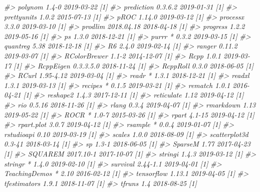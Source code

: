 \documentclass[]{krantz}
\makeatletter
\newenvironment{Shaded}{\begin{snugshade}}{\end{snugshade}}
\newcommand{\CommentTok}[1]{\textcolor[rgb]{0.37,0.37,0.37}{\textit{#1}}}
\newenvironment{kframe}{%
\medskip{}
\setlength{\fboxsep}{.8em}
 \def\at@end@of@kframe{}%
 \ifinner\ifhmode%
  \def\at@end@of@kframe{\end{minipage}}%
  \begin{minipage}{\columnwidth}%
 \fi\fi%
 \def\FrameCommand##1{\hskip\@totalleftmargin \hskip-\fboxsep
 \colorbox{shadecolor}{##1}\hskip-\fboxsep
     \hskip-\linewidth \hskip-\@totalleftmargin \hskip\columnwidth}%
 \MakeFramed {\advance\hsize-\width
   \@totalleftmargin\z@ \linewidth\hsize
   \@setminipage}}%
 {\par\unskip\endMakeFramed%
 \at@end@of@kframe}
\renewenvironment{Shaded}{\begin{kframe}}{\end{kframe}}
\makeatother
\begin{document}
\begin{Shaded}
\begin{Highlighting}[]
\CommentTok{#>    polynom         1.4-0      2019-03-22 [1]}
\CommentTok{#>    prediction      0.3.6.2    2019-01-31 [1]}
\CommentTok{#>    prettyunits     1.0.2      2015-07-13 [1]}
\CommentTok{#>    pROC            1.14.0     2019-03-12 [1]}
\CommentTok{#>    processx        3.3.0      2019-03-10 [1]}
\CommentTok{#>    prodlim         2018.04.18 2018-04-18 [1]}
\CommentTok{#>    progress        1.2.2      2019-05-16 [1]}
\CommentTok{#>    ps              1.3.0      2018-12-21 [1]}
\CommentTok{#>    purrr         * 0.3.2      2019-03-15 [1]}
\CommentTok{#>    quantreg        5.38       2018-12-18 [1]}
\CommentTok{#>    R6              2.4.0      2019-02-14 [1]}
\CommentTok{#>    ranger          0.11.2     2019-03-07 [1]}
\CommentTok{#>    RColorBrewer    1.1-2      2014-12-07 [1]}
\CommentTok{#>    Rcpp            1.0.1      2019-03-17 [1]}
\CommentTok{#>    RcppEigen       0.3.3.5.0  2018-11-24 [1]}
\CommentTok{#>    RcppRoll        0.3.0      2018-06-05 [1]}
\CommentTok{#>    RCurl           1.95-4.12  2019-03-04 [1]}
\CommentTok{#>    readr         * 1.3.1      2018-12-21 [1]}
\CommentTok{#>    readxl          1.3.1      2019-03-13 [1]}
\CommentTok{#>    recipes       * 0.1.5      2019-03-21 [1]}
\CommentTok{#>    rematch         1.0.1      2016-04-21 [1]}
\CommentTok{#>    reshape2        1.4.3      2017-12-11 [1]}
\CommentTok{#>    reticulate      1.12       2019-04-12 [1]}
\CommentTok{#>    rio             0.5.16     2018-11-26 [1]}
\CommentTok{#>    rlang           0.3.4      2019-04-07 [1]}
\CommentTok{#>    rmarkdown       1.13       2019-05-22 [1]}
\CommentTok{#>    ROCR          * 1.0-7      2015-03-26 [1]}
\CommentTok{#>    rpart           4.1-15     2019-04-12 [1]}
\CommentTok{#>    rpart.plot      3.0.7      2019-04-12 [1]}
\CommentTok{#>    rsample       * 0.0.4      2019-01-07 [1]}
\CommentTok{#>    rstudioapi      0.10       2019-03-19 [1]}
\CommentTok{#>    scales          1.0.0      2018-08-09 [1]}
\CommentTok{#>    scatterplot3d   0.3-41     2018-03-14 [1]}
\CommentTok{#>    sp              1.3-1      2018-06-05 [1]}
\CommentTok{#>    SparseM         1.77       2017-04-23 [1]}
\CommentTok{#>    SQUAREM         2017.10-1  2017-10-07 [1]}
\CommentTok{#>    stringi         1.4.3      2019-03-12 [1]}
\CommentTok{#>    stringr       * 1.4.0      2019-02-10 [1]}
\CommentTok{#>    survival        2.44-1.1   2019-04-01 [1]}
\CommentTok{#>    TeachingDemos * 2.10       2016-02-12 [1]}
\CommentTok{#>    tensorflow      1.13.1     2019-04-05 [1]}
\CommentTok{#>    tfestimators    1.9.1      2018-11-07 [1]}
\CommentTok{#>    tfruns          1.4        2018-08-25 [1]}

\end{Highlighting}
\end{Shaded}
\end{document}
